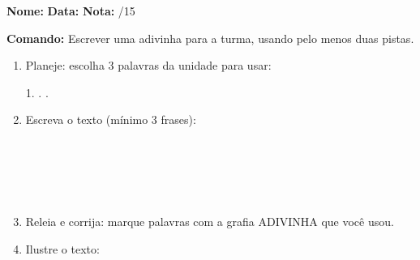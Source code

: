 \begin{exercicio}

\noindent\textbf{Nome:} \underline{\hspace{3.2cm}} \quad \textbf{Data:} \underline{\hspace{1.6cm}} \quad \textbf{Nota:} \underline{\hspace{0.9cm}}/15


\noindent\textbf{Comando:} Escrever uma adivinha para a turma, usando pelo menos duas pistas.


\begin{enumerate}

  \item Planeje: escolha 3 palavras da unidade para usar:
  \begin{center}
  1. \underline{\hspace{3cm}} . \underline{\hspace{3cm}} . \underline{\hspace{3cm}}
  \end{center}

  \item Escreva o texto (mínimo 3 frases):
  \begin{center}
  \underline{\hspace{12cm}}\\\underline{\hspace{12cm}}\\\underline{\hspace{12cm}}\\\underline{\hspace{12cm}}\\\underline{\hspace{12cm}}
  \end{center}

  \item Releia e corrija: marque palavras com a grafia ADIVINHA que você usou.

  \item Ilustre o texto:
  \begin{center}
  \end{center}

\end{enumerate}

\end{exercicio}

